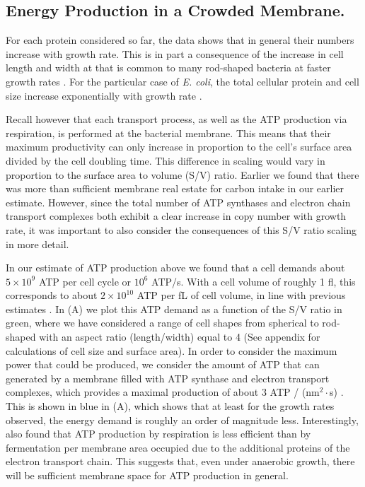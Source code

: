 \subsection{Energy Production in a Crowded Membrane.}

For each protein considered so far, the data shows that in general their numbers
increase with growth rate. This is in part a consequence of the increase in cell
length and width at that is common to many rod-shaped bacteria at faster growth
rates \citep{ojkic2019, harris2018}. For the particular case of \textit{E.
coli}, the total cellular protein and cell size increase exponentially with
growth rate \citep{schaechter1958, si2017}.

Recall however that each transport process, as well as the ATP production via
respiration, is performed at the bacterial membrane. This means that their
maximum productivity can only increase in proportion to the cell's surface
area divided by the cell doubling time. This difference in scaling would vary
in proportion to the surface area to volume (S/V) ratio. Earlier we found
that there was more than sufficient membrane real estate for carbon intake in
our earlier estimate. However, since the total number of ATP synthases and
electron chain transport complexes both exhibit a clear increase in copy
number with growth rate, it was important to also consider the consequences
of this S/V ratio scaling in more detail.

In our estimate of ATP production above we found that a cell demands about
$5 \times 10^9$ ATP per cell cycle or $10^6$ ATP/s. With a cell volume of roughly 1 fl, this
corresponds to about $2 \times 10^{10}$ ATP per fL of cell volume, in line  with
previous estimates \citep{stouthamer1977, szenk2017}. In  (A)
we plot this ATP demand as a function of the S/V ratio in green, where we have
considered a range of cell shapes from spherical to rod-shaped with an aspect
ratio (length/width) equal to 4 (See appendix for calculations of cell size
and surface area).  In order to consider the maximum power that could be
produced, we consider the amount of ATP that can generated by a membrane filled
with ATP synthase and electron transport complexes, which provides a maximal
production of about 3 ATP / (nm$^2 \cdot$s) \citep{szenk2017}. This is shown in
blue in (A), which shows that at least for the growth rates
observed, the energy demand is roughly an order of magnitude less.
Interestingly, \cite{szenk2017} also found that ATP production by
respiration is less efficient than by fermentation per membrane area occupied
due to the additional proteins of the electron transport chain. This suggests
that, even under anaerobic growth, there will be sufficient membrane space for
ATP production in general.


